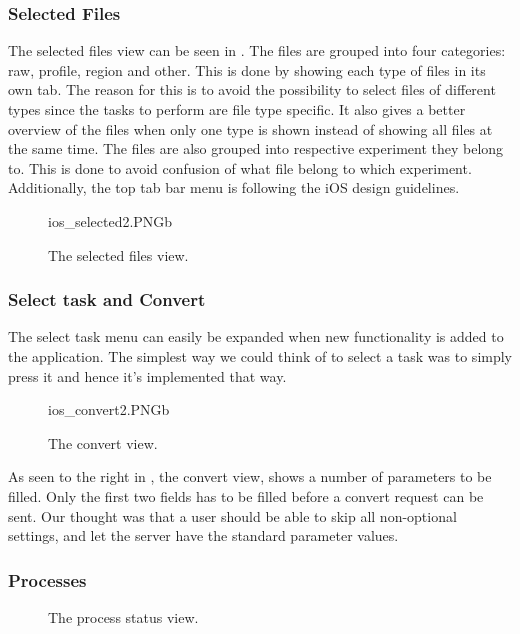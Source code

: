 \subsubsection{Selected Files}
The selected files view can be seen in . The files are grouped into four categories: raw, profile, region and other. This is done by showing each type of files in its own tab. The reason for this is to avoid the possibility to select files of different types since the tasks to perform are file type specific. It also gives a better overview of the files when only one type is shown instead of showing all files at the same time. The files are also grouped into respective experiment they belong to. This is done to avoid confusion of what file belong to which experiment. Additionally, the top tab bar menu is following the iOS design guidelines.

\begin{figure}[ht]
		{ios_selected2.PNG}{b}
\caption{The selected files view.}
\label{fig:ios_selectedFiles2}
\end{figure}
\FloatBarrier

\subsubsection{Select task and Convert}
The select task menu can easily be expanded when new functionality is added to the application. The simplest way we could think of to select a task was to simply press it and hence it's implemented that way.
\begin{figure}[ht]
		{ios_convert2.PNG}{b}
\caption{The convert view.}
\label{fig:ios_convertParameters}
\end{figure}
\FloatBarrier

As seen to the right in , the convert view, shows a number of parameters to be filled. Only the first two fields has to be filled before a convert request can be sent. Our thought was that a user should be able to skip all non-optional settings, and let the server have the standard parameter values. 


\subsubsection{Processes}
\begin{figure}[ht]
\caption{The process status view.}
\label{fig:ios_processingStatus}
\end{figure}
\FloatBarrier

